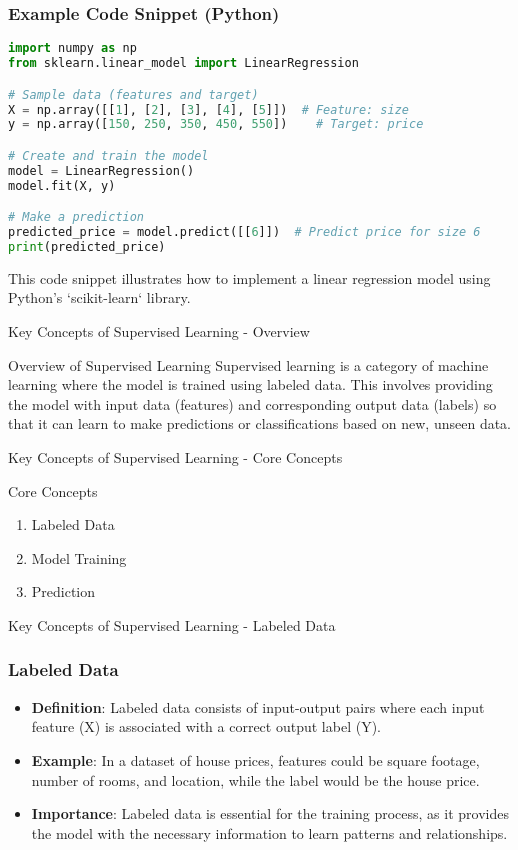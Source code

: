 \documentclass[aspectratio=169]{beamer}
\begin{document}
\begin{frame}[fragile]
    \frametitle{Example Code Snippet (Python)}
    \begin{lstlisting}[language=Python]
import numpy as np
from sklearn.linear_model import LinearRegression

# Sample data (features and target)
X = np.array([[1], [2], [3], [4], [5]])  # Feature: size 
y = np.array([150, 250, 350, 450, 550])    # Target: price

# Create and train the model
model = LinearRegression()
model.fit(X, y)

# Make a prediction
predicted_price = model.predict([[6]])  # Predict price for size 6
print(predicted_price)
    \end{lstlisting}
    This code snippet illustrates how to implement a linear regression model using Python's `scikit-learn` library.
\end{frame}

\begin{frame}[fragile]{Key Concepts of Supervised Learning - Overview}
    \begin{block}{Overview of Supervised Learning}
        Supervised learning is a category of machine learning where the model is trained using labeled data. 
        This involves providing the model with input data (features) and corresponding output data (labels) 
        so that it can learn to make predictions or classifications based on new, unseen data.
    \end{block}
\end{frame}

\begin{frame}[fragile]{Key Concepts of Supervised Learning - Core Concepts}
    \begin{block}{Core Concepts}
        \begin{enumerate}
            \item Labeled Data
            \item Model Training
            \item Prediction
        \end{enumerate}
    \end{block}
\end{frame}

\begin{frame}[fragile]{Key Concepts of Supervised Learning - Labeled Data}
    \frametitle{Labeled Data}
    \begin{itemize}
        \item \textbf{Definition}: Labeled data consists of input-output pairs where each input feature (X) is 
        associated with a correct output label (Y).
        \item \textbf{Example}: In a dataset of house prices, features could be square footage, number of rooms, 
        and location, while the label would be the house price.
        \item \textbf{Importance}: Labeled data is essential for the training process, as it provides the 
        model with the necessary information to learn patterns and relationships.
    \end{itemize}
\end{frame}
\end{document}

